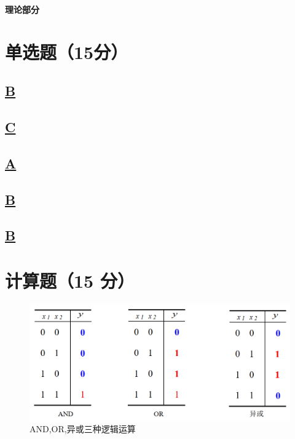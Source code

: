 \documentclass[UTF8, a4paper]{article}
\begin{document}
\vspace{3mm}
\centerline{\textbf{\Large{理论部分}}}

\section{单选题（15分）}
\subsection{\underline{B}}

\subsection{\underline{C}}

\subsection{\underline{A}}

\subsection{\underline{B}}

\subsection{\underline{B}}

\section{计算题（15 分）}

\begin{figure}[h]
    \centering
    \includegraphics[width=12cm]{Fig1.png}
    \caption{AND,OR,异或三种逻辑运算}
    \label{fig:label_1}
\end{figure}
\end{document}
